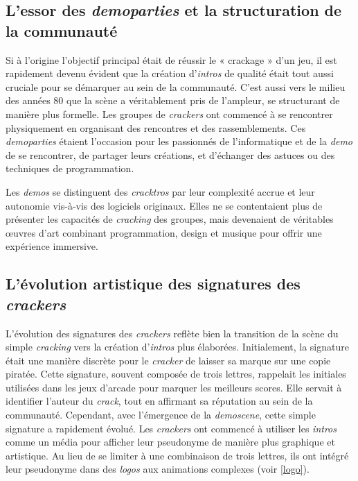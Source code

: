 \subsection*{L'essor des \textit{demoparties} et la structuration de la communauté}

Si à l'origine l'objectif principal était de réussir le « crackage » d'un jeu, il est rapidement devenu évident que la création d'\textit{intros} de qualité était tout aussi cruciale pour se démarquer au sein de la communauté. C'est aussi vers le milieu des années 80 que la scène a véritablement pris de l'ampleur, se structurant de manière plus formelle. Les groupes de \textit{crackers} ont commencé à se rencontrer physiquement en organisant des rencontres et des rassemblements. Ces \textit{demoparties} étaient l'occasion pour les passionnés de l'informatique et de la \textit{demo} de se rencontrer, de partager leurs créations, et d'échanger des astuces ou des techniques de programmation. 

Les \textit{demos} se distinguent des \textit{cracktros} par leur complexité accrue et leur autonomie vis-à-vis des logiciels originaux. Elles ne se contentaient plus de présenter les capacités de \textit{cracking} des groupes, mais devenaient de véritables œuvres d'art combinant programmation, design et musique pour offrir une expérience immersive.

\subsection*{L'évolution artistique des signatures des \textit{crackers}}
L'évolution des signatures des \textit{crackers} reflète bien la transition de la scène du simple \textit{cracking} vers la création d'\textit{intros} plus élaborées. Initialement, la signature était une manière discrète pour le \textit{cracker} de laisser sa marque sur une copie piratée. Cette signature, souvent composée de trois lettres, rappelait les initiales utilisées dans les jeux d'arcade pour marquer les meilleurs scores. Elle servait à identifier l'auteur du \textit{crack}, tout en affirmant sa réputation au sein de la communauté. Cependant, avec l'émergence de la \textit{demoscene}, cette simple signature a rapidement évolué. Les \textit{crackers} ont commencé à utiliser les \textit{intros} comme un média pour afficher leur pseudonyme de manière plus graphique et artistique. Au lieu de se limiter à une combinaison de trois lettres, ils ont intégré leur pseudonyme dans des \textit{logos} aux animations complexes (voir \ref{logo}).

